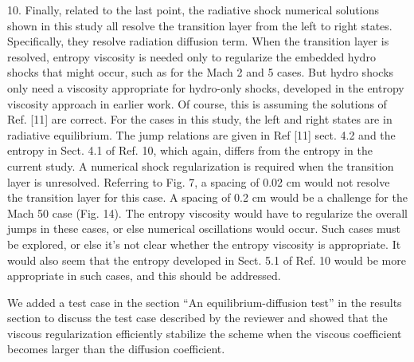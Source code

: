 \documentclass{article}
\begin{document}
{
\color{blue}
10. Finally, related to the last point, the radiative shock numerical solutions shown in this study all resolve the transition layer from the left to right states. Specifically, they resolve radiation diffusion term. When the transition layer is resolved, entropy viscosity is needed only to regularize the embedded hydro shocks that might occur, such as for the Mach 2 and 5 cases. But hydro shocks only need a viscosity appropriate for hydro-only shocks, developed in the entropy viscosity approach in earlier work. Of course, this is assuming the solutions of Ref. [11] are correct.
For the cases in this study, the left and right states are in radiative equilibrium. The jump relations are given in Ref [11] sect. 4.2 and the entropy in Sect. 4.1 of Ref. 10, which again, differs from the entropy in the current study. A numerical shock regularization is required when the transition layer is unresolved. Referring to Fig. 7, a spacing of 0.02 cm would not resolve the transition layer for this case. A spacing of 0.2 cm would be a challenge for the Mach 50 case (Fig. 14). The entropy viscosity would have to regularize the overall jumps in these cases, or else numerical oscillations would occur. Such cases must be explored, or else it's not clear whether the entropy viscosity is appropriate. It would also seem that the entropy developed in Sect. 5.1 of Ref. 10 would be more appropriate in such cases, and this should be addressed.
}

We added a test case in the section ``An equilibrium-diffusion test'' in the results section to discuss the test case described by the reviewer and showed that the viscous regularization efficiently stabilize the scheme when the viscous coefficient becomes larger than the diffusion coefficient. 
\bigskip
\end{document}
